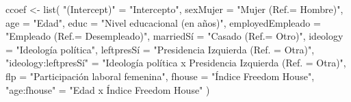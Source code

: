 \documentclass[
  12pt,
  a4paper,
]{article}
\newenvironment{Shaded}{\begin{snugshade}}{\end{snugshade}}
\newcommand{\AttributeTok}[1]{\textcolor[rgb]{0.77,0.63,0.00}{#1}}
\newcommand{\FunctionTok}[1]{\textcolor[rgb]{0.00,0.00,0.00}{#1}}
\newcommand{\NormalTok}[1]{#1}
\newcommand{\OtherTok}[1]{\textcolor[rgb]{0.56,0.35,0.01}{#1}}
\newcommand{\StringTok}[1]{\textcolor[rgb]{0.31,0.60,0.02}{#1}}
\begin{document}
\begin{Shaded}
\begin{Highlighting}[]
\NormalTok{ccoef }\OtherTok{\textless{}{-}} \FunctionTok{list}\NormalTok{(}
  \StringTok{"(Intercept)"} \OtherTok{=} \StringTok{"Intercepto"}\NormalTok{,}
  \AttributeTok{sexMujer =} \StringTok{"Mujer (Ref.= Hombre)"}\NormalTok{,}
  \AttributeTok{age =} \StringTok{"Edad"}\NormalTok{,}
  \AttributeTok{educ =} \StringTok{"Nivel educacional (en años)"}\NormalTok{,}
  \AttributeTok{employedEmpleado =} \StringTok{"Empleado (Ref.= Desempleado)"}\NormalTok{,}
\NormalTok{  marriedSí }\OtherTok{=} \StringTok{"Casado (Ref.= Otro)"}\NormalTok{,}
  \AttributeTok{ideology =} \StringTok{"Ideología política"}\NormalTok{,}
\NormalTok{  leftpresSí }\OtherTok{=} \StringTok{"Presidencia Izquierda (Ref. = Otra)"}\NormalTok{,}
  \StringTok{"ideology:leftpresSí"} \OtherTok{=} \StringTok{"Ideología política x Presidencia Izquierda (Ref. = Otra)"}\NormalTok{,}
  \AttributeTok{flp =} \StringTok{"Participación laboral femenina"}\NormalTok{,}
  \AttributeTok{fhouse =} \StringTok{"Índice Freedom House"}\NormalTok{,}
  \StringTok{"age:fhouse"} \OtherTok{=} \StringTok{"Edad x Índice Freedom House"}
\NormalTok{)}



\end{Highlighting}
\end{Shaded}
\end{document}
